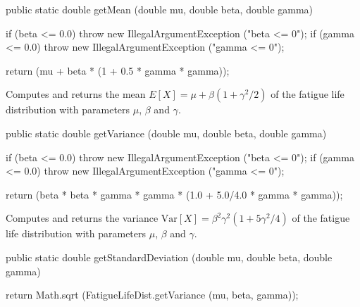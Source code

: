 \begin{htmlonly}
\end{htmlonly}
\begin{code}

   public static double getMean (double mu, double beta, double gamma)\begin{hide} {
      if (beta <= 0.0)
         throw new IllegalArgumentException ("beta <= 0");
      if (gamma <= 0.0)
         throw new IllegalArgumentException ("gamma <= 0");

      return (mu + beta * (1 + 0.5 * gamma * gamma));
   }\end{hide}
\end{code}
\begin{tabb}  Computes and returns the mean
   $E[X] = \mu + \beta(1 + \gamma^2/2)$
 of the fatigue life distribution with parameters $\mu$, $\beta$ and $\gamma$.
\begin{htmlonly}
\end{htmlonly}
\end{tabb}
\begin{code}

   public static double getVariance (double mu, double beta, double gamma)\begin{hide} {
      if (beta <= 0.0)
         throw new IllegalArgumentException ("beta <= 0");
      if (gamma <= 0.0)
         throw new IllegalArgumentException ("gamma <= 0");

      return (beta * beta * gamma * gamma * (1.0 + 5.0/4.0 * gamma * gamma));
   }\end{hide}
\end{code}
\begin{tabb}  Computes and returns the variance 
$\mbox{Var}[X] = \beta^2 \gamma^2 (1 + 5 \gamma^2/4)$ of the fatigue life distribution
   with parameters $\mu$, $\beta$ and $\gamma$.
\begin{htmlonly}
\end{htmlonly}
\end{tabb}
\begin{code}

   public static double getStandardDeviation (double mu, double beta,
                                              double gamma)\begin{hide} {
      return Math.sqrt (FatigueLifeDist.getVariance (mu, beta, gamma));
   }\end{hide}
\end{code}
